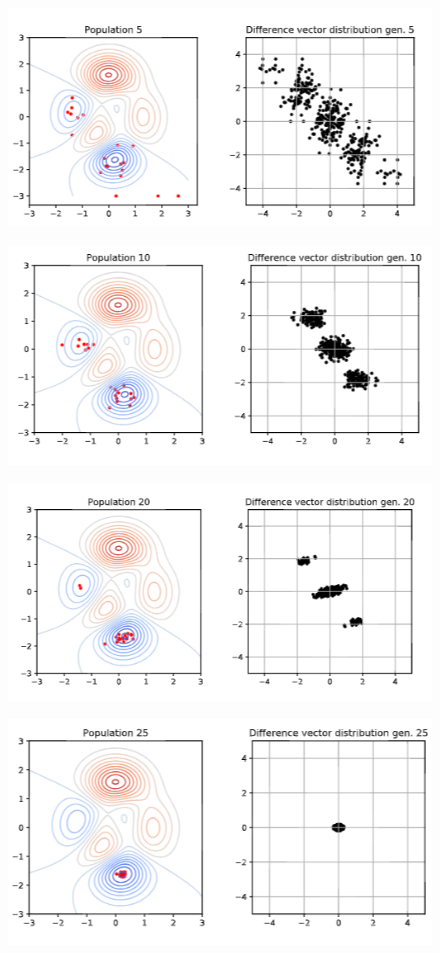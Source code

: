 \documentclass{book}
\begin{document}
\begin{figure}[H]
    \centering
    \includegraphics[width=0.75\linewidth]{images/GA-3_12.png}
\end{figure}

\begin{figure}[H]
    \centering
    \includegraphics[width=0.75\linewidth]{images/GA-3_13.png}
\end{figure}

\begin{figure}[H]
    \centering
    \includegraphics[width=0.75\linewidth]{images/GA-3_14.png}
\end{figure}

\begin{figure}[H]
    \centering
    \includegraphics[width=0.75\linewidth]{images/GA-3_15.png}
\end{figure}
\end{document}
